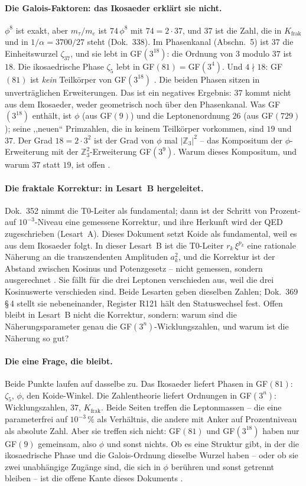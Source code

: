 \paragraph{Die Galois-Faktoren: das Ikosaeder erklärt sie nicht.}
$\phi^8$ ist exakt, aber $m_\tau/m_e$ ist $74\,\phi^8$ mit $74 = 2\cdot37$, und
$37$ ist die Zahl, die in $K_\text{frak}$ und in $1/\alpha = 3700/27$ steht
(Dok.~338). Im Phasenkanal (Abschn.~5) ist $37$ die Einheitswurzel $\zeta_{37}$,
und sie lebt in GF$(3^{18})$: die Ordnung von $3$ modulo $37$ ist $18$. Die
ikosaedrische Phase $\zeta_5$ lebt in GF$(81)=$GF$(3^4)$. Und $4\nmid18$: GF$(81)$
ist \emph{kein} Teilkörper von GF$(3^{18})$ \BM. Die beiden Phasen sitzen in
unverträglichen Erweiterungen. Das ist ein negatives Ergebnis: $37$ kommt nicht
aus dem Ikosaeder, weder geometrisch noch über den Phasenkanal. Was GF$(3^{18})$
enthält, ist $\phi$ (aus GF$(9)$) und die Leptonenordnung $26$ (aus GF$(729)$);
seine ,,neuen`` Primzahlen, die in keinem Teilkörper vorkommen, sind $19$ und
$37$. Der Grad $18 = 2\cdot3^2$ ist der Grad von $\phi$ mal $|\mathbb{Z}_3|^2$ --
das Kompositum der $\phi$-Erweiterung mit der $\mathbb{Z}_3^2$-Erweiterung
GF$(3^9)$. Warum dieses Kompositum, und warum $37$ statt $19$, ist offen \SM.

\paragraph{Die fraktale Korrektur: in Lesart~B hergeleitet.}
Dok.~352 nimmt die T0-Leiter als fundamental; dann ist der Schritt von
Prozent- auf $10^{-3}$-Niveau eine gemessene Korrektur, und ihre Herkunft wird
der QED zugeschrieben (Lesart~A). Dieses Dokument setzt Koide als fundamental,
weil es aus dem Ikosaeder folgt. In dieser Lesart~B ist die T0-Leiter
$r_k\,\xi^{p_k}$ eine rationale Näherung an die transzendenten Amplituden
$a_k^2$, und die Korrektur ist der Abstand zwischen Kosinus und Potenzgesetz --
nicht gemessen, sondern ausgerechnet \KM. Sie fällt für die drei Leptonen
verschieden aus, weil die drei Kosinuswerte verschieden sind. Beide Lesarten
geben dieselben Zahlen; Dok.~369 §\,4 stellt sie nebeneinander, Register R121
hält den Statuswechsel fest. Offen bleibt in Lesart~B nicht die Korrektur,
sondern: warum sind die Näherungsparameter genau die GF$(3^n)$-Wicklungszahlen,
und warum ist die Näherung so gut?

\paragraph{Die eine Frage, die bleibt.}
Beide Punkte laufen auf dasselbe zu. Das Ikosaeder liefert Phasen in GF$(81)$:
$\zeta_5$, $\phi$, den Koide-Winkel. Die Zahlentheorie liefert Ordnungen in
GF$(3^n)$: Wicklungszahlen, $37$, $K_\text{frak}$. Beide Seiten treffen die
Leptonmassen -- die eine parameterfrei auf $10^{-3}\,\%$ als Verhältnis, die
andere mit Anker auf Prozentniveau als absolute Zahl. Aber sie treffen sich
nicht: GF$(81)$ und GF$(3^{18})$ haben nur GF$(9)$ gemeinsam, also $\phi$ und
sonst nichts. Ob es eine Struktur gibt, in der die ikosaedrische Phase und die
Galois-Ordnung dieselbe Wurzel haben -- oder ob sie zwei unabhängige Zugänge
sind, die sich in $\phi$ berühren und sonst getrennt bleiben -- ist die offene
Kante dieses Dokuments \SM.

